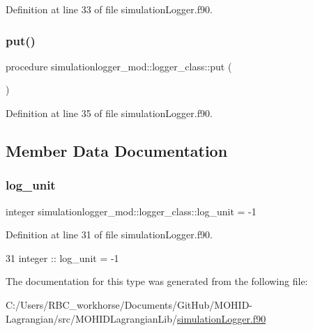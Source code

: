 Definition at line 33 of file simulation\+Logger.\+f90.

\mbox{\label{structsimulationlogger__mod_1_1logger__class_abe32488ffbf501397d43d1a61826cda6}} 
\subsubsection{\texorpdfstring{put()}{put()}}
{\footnotesize\ttfamily procedure simulationlogger\+\_\+mod\+::logger\+\_\+class\+::put (\begin{DoxyParamCaption}{ }\end{DoxyParamCaption})\hspace{0.3cm}{\ttfamily [private]}}



Definition at line 35 of file simulation\+Logger.\+f90.



\subsection{Member Data Documentation}
\mbox{\label{structsimulationlogger__mod_1_1logger__class_a3eb0b4ee7724fc420af081967ce767bd}} 
\subsubsection{\texorpdfstring{log\+\_\+unit}{log\_unit}}
{\footnotesize\ttfamily integer simulationlogger\+\_\+mod\+::logger\+\_\+class\+::log\+\_\+unit = -\/1\hspace{0.3cm}{\ttfamily [private]}}



Definition at line 31 of file simulation\+Logger.\+f90.


\begin{DoxyCode}
31         \textcolor{keywordtype}{integer} :: log\_unit = -1
\end{DoxyCode}


The documentation for this type was generated from the following file\+:\begin{DoxyCompactItemize}
\item 
C\+:/\+Users/\+R\+B\+C\+\_\+workhorse/\+Documents/\+Git\+Hub/\+M\+O\+H\+I\+D-\/\+Lagrangian/src/\+M\+O\+H\+I\+D\+Lagrangian\+Lib/\mbox{\hyperlink{simulation_logger_8f90}{simulation\+Logger.\+f90}}\end{DoxyCompactItemize}

